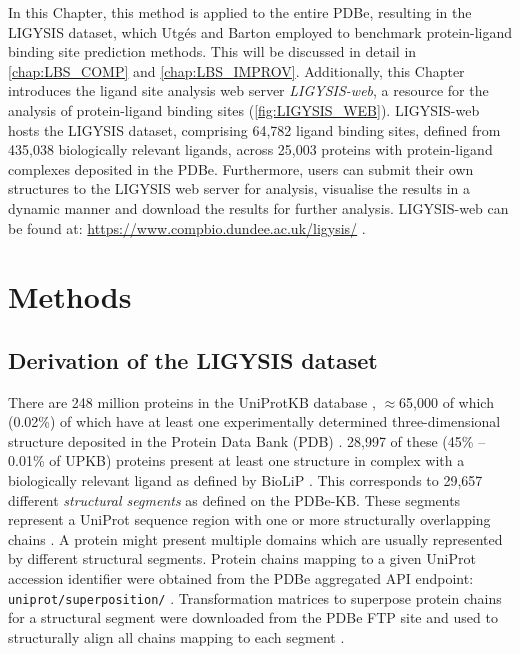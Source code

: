 In this Chapter, this method is applied to the entire PDBe, resulting in the LIGYSIS dataset, which Utgés and Barton \cite{UTGES_2024_LBSCOMP} employed to benchmark protein-ligand binding site prediction methods. This will be discussed in detail in \autoref{chap:LBS_COMP} and \autoref{chap:LBS_IMPROV}. Additionally, this Chapter introduces the ligand site analysis web server \textit{LIGYSIS-web}, a resource for the analysis of protein-ligand binding sites (\autoref{fig:LIGYSIS_WEB}). LIGYSIS-web hosts the LIGYSIS dataset, comprising 64,782 ligand binding sites, defined from 435,038 biologically relevant ligands, across 25,003 proteins with protein-ligand complexes deposited in the PDBe. Furthermore, users can submit their own structures to the LIGYSIS web server for analysis, visualise the results in a dynamic manner and download the results for further analysis. LIGYSIS-web can be found at: \url{https://www.compbio.dundee.ac.uk/ligysis/} \cite{LIGYSIS_SERVER}.

\section{Methods}

\subsection{Derivation of the LIGYSIS dataset}

There are 248 million proteins in the UniProtKB database \cite{UNIPROT_2020_UNIPROT}, $\approx$65,000 of which (0.02\%) of which have at least one experimentally determined three-dimensional structure deposited in the Protein Data Bank (PDB) \cite{ARMSTRONG_2020_PDBE}. 28,997 of these (45\% -- 0.01\% of UPKB) proteins present at least one structure in complex with a biologically relevant ligand as defined by BioLiP \cite{YANG_2013_BIOLIP}. This corresponds to 29,657 different \textit{structural segments} as defined on the PDBe-KB. These segments represent a UniProt sequence region with one or more structurally overlapping chains  \cite{ELLAWAY_2024_CONFORMATIONS}. A protein might present multiple domains which are usually represented by different structural segments. Protein chains mapping to a given UniProt accession identifier were obtained from the PDBe aggregated API endpoint: \texttt{uniprot/superposition/} \cite{SUPP_ENDPOINT, PDBEKB_2019_PDBEKB}. Transformation matrices to superpose protein chains for a structural segment were downloaded from the PDBe FTP site \cite{SUPP_FTP_ENDPOINT} and used to structurally align all chains mapping to each segment \cite{PDBE_2022_PDBEKB}.

